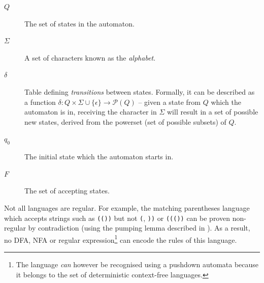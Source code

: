 \documentclass[a4paper,openany,12pt]{book}
\begin{document}
\begin{description}
\item[$Q$] The set of states in the automaton.
\item[$\Sigma$] A set of characters known as the \emph{alphabet}.
\item[$\delta$] Table defining \emph{transitions} between states. Formally, it can be described as a function $\delta : Q \times \Sigma \cup \{\epsilon\} \rightarrow \mathcal{P}(Q)$ -- given a state from $Q$ which the automaton is in, receiving the character in $\Sigma$ will result in a set of possible new states, derived from the powerset (set of possible subsets) of $Q$.
\item[$q_0$] The initial state which the automaton starts in.
\item[$F$] The set of accepting states.
\end{description}

Not all languages are regular. For example, the matching parentheses language which accepts strings such as \texttt{(())} but not \texttt{(}, \texttt{))} or \texttt{((())} can be proven non-regular by contradiction (using the pumping lemma described in \citet{rabin1959finite}). As a result, no DFA, NFA or regular expression\footnote{The language \emph{can} however be recognised using a pushdown automata because it belongs to the set of deterministic context-free languages.} can encode the rules of this language.
\end{document}
